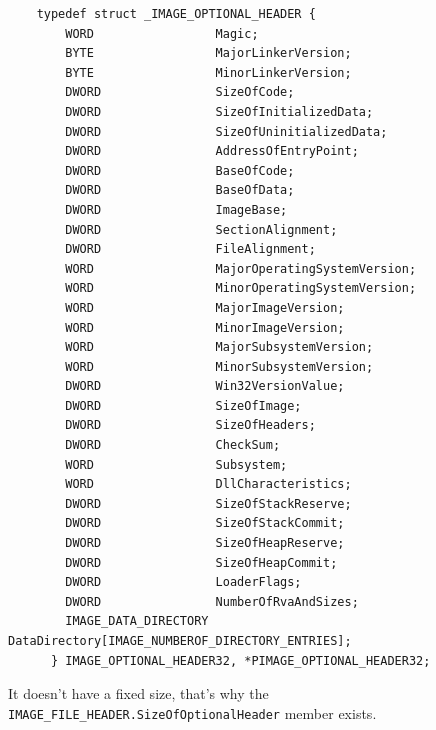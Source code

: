 \begin{verbatim}
    typedef struct _IMAGE_OPTIONAL_HEADER {
        WORD                 Magic;
        BYTE                 MajorLinkerVersion;
        BYTE                 MinorLinkerVersion;
        DWORD                SizeOfCode;
        DWORD                SizeOfInitializedData;
        DWORD                SizeOfUninitializedData;
        DWORD                AddressOfEntryPoint;
        DWORD                BaseOfCode;
        DWORD                BaseOfData;
        DWORD                ImageBase;
        DWORD                SectionAlignment;
        DWORD                FileAlignment;
        WORD                 MajorOperatingSystemVersion;
        WORD                 MinorOperatingSystemVersion;
        WORD                 MajorImageVersion;
        WORD                 MinorImageVersion;
        WORD                 MajorSubsystemVersion;
        WORD                 MinorSubsystemVersion;
        DWORD                Win32VersionValue;
        DWORD                SizeOfImage;
        DWORD                SizeOfHeaders;
        DWORD                CheckSum;
        WORD                 Subsystem;
        WORD                 DllCharacteristics;
        DWORD                SizeOfStackReserve;
        DWORD                SizeOfStackCommit;
        DWORD                SizeOfHeapReserve;
        DWORD                SizeOfHeapCommit;
        DWORD                LoaderFlags;
        DWORD                NumberOfRvaAndSizes;
        IMAGE_DATA_DIRECTORY DataDirectory[IMAGE_NUMBEROF_DIRECTORY_ENTRIES];
      } IMAGE_OPTIONAL_HEADER32, *PIMAGE_OPTIONAL_HEADER32;
\end{verbatim}

It doesn’t have a fixed size, that’s why the \verb+IMAGE_FILE_HEADER.SizeOfOptionalHeader+ member exists.

